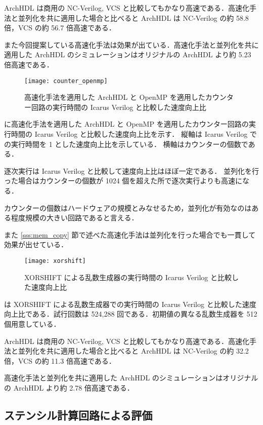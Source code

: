 ArchHDL は商用の NC-Verilog, VCS と比較してもかなり高速である．高速化手法と並列化を共に適用した場合と比べると ArchHDL は NC-Verilog の約 58.8 倍，VCS の約 56.7 倍高速である．

また今回提案している高速化手法は効果が出ている．高速化手法と並列化を共に適用した ArchHDL のシミュレーションはオリジナルの ArchHDL より約 5.23 倍高速である．



\begin{figure}[t]
 \centering
 \texttt{[image: counter\_openmp]}
 \caption{高速化手法を適用した ArchHDL と OpenMP を適用したカウンター回路の実行時間の Icarus Verilog と比較した速度向上比}
 \label{fig:counter_con}
\end{figure}

 に高速化手法を適用した ArchHDL と OpenMP を適用したカウンター回路の実行時間の Icarus Verilog と比較した速度向上比を示す．
縦軸は Icarus Verilog での実行時間を 1 とした速度向上比を示している．
横軸はカウンターの個数である．

逐次実行は Icarus Verilog と比較して速度向上比はほぼ一定である．
並列化を行った場合はカウンターの個数が 1024 個を超えた所で逐次実行よりも高速になる．

カウンターの個数はハードウェアの規模とみなせるため，並列化が有効なのはある程度規模の大きい回路であると言える．

また \ref{sss:mem_copy} 節で述べた高速化手法は並列化を行った場合でも一貫して効果が出せている．

\begin{figure}[t]
 \centering
 \texttt{[image: xorshift]}
 \caption{XORSHIFT による乱数生成器の実行時間の Icarus Verilog と比較した速度向上比}
 \label{fig:xorshift}
\end{figure}

 は XORSHIFT による乱数生成器での実行時間の Icarus Verilog と比較した速度向上比である．試行回数は 524,288 回である．初期値の異なる乱数生成器を 512 個用意している．

ArchHDL は商用の NC-Verilog, VCS と比較してもかなり高速である．高速化手法と並列化を共に適用した場合と比べると ArchHDL は NC-Verilog の約 32.2 倍，VCS の約 11.3 倍高速である．

高速化手法と並列化を共に適用した ArchHDL のシミュレーションはオリジナルの ArchHDL より約 2.78 倍高速である．


\subsection{ステンシル計算回路による評価}

